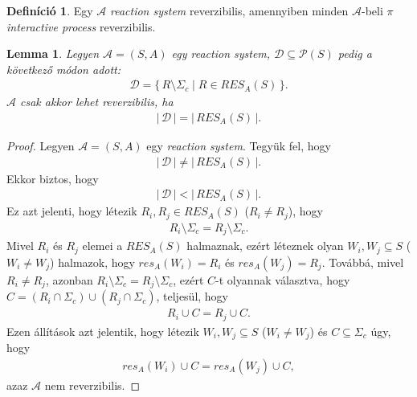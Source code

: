 \documentclass[12pt]{article}
\theoremstyle{definition}
\newtheorem*{definition*}{Definíció}
\theoremstyle{remark}
\theoremstyle{plain}
\theoremstyle{plain}
\newtheorem*{lemma*}{Lemma}
\newcommand{\res}{\textit{res}}
\begin{document}
    \begin{definition*}
        Egy $\mathscr{A}$ \textit{reaction system} reverzibilis, amennyiben minden $\mathscr{A}$-beli $\pi$ \textit{interactive process} reverzibilis.
    \end{definition*}

    \begin{lemma*}
        Legyen $\mathscr{A} = (S, A)$ egy \textit{reaction system}, $\mathcal{D} \subseteq \mathcal{P}(S)$ pedig a következő módon adott:
        \begin{align*}
            \mathcal{D} = \{ \, R \setminus \Sigma_{c} \mid R \in \textit{RES}_{A}(S) \, \}.
        \end{align*}
        $\mathscr{A}$ csak akkor lehet reverzibilis, ha
        \begin{align*}
            |\,\mathcal{D}\,| = |\,\textit{RES}_{A}(S)\,|.
        \end{align*}
    \end{lemma*}

    \begin{proof}
        Legyen $\mathscr{A} = (S, A)$ egy \textit{reaction system}. Tegyük fel, hogy 
        \begin{align*}
            |\,\mathcal{D}\,| \neq |\,\textit{RES}_{A}(S)\,|.
        \end{align*}
        Ekkor biztos, hogy
        \begin{align*}
            |\,\mathcal{D}\,| < |\,\textit{RES}_{A}(S)\,|.
        \end{align*}
        Ez azt jelenti, hogy létezik $R_{i}, R_{j} \in \textit{RES}_{A}(S)$ ($R_{i} \neq R_{j}$), hogy
        \begin{align*}
            R_{i} \setminus \Sigma_{c} = R_{j} \setminus \Sigma_{c}.
        \end{align*}
        Mivel $R_{i}$ és $R_{j}$ elemei a $\textit{RES}_{A}(S)$ halmaznak, ezért léteznek olyan $W_{i}, W_{j} \subseteq S$ ($W_{i} \neq W_{j}$) halmazok, hogy $\res_{A}(W_{i}) = R_{i}$ és $\res_{A}(W_{j}) = R_{j}$. Továbbá, mivel $R_{i} \neq R_{j}$, azonban $R_{i} \setminus \Sigma_{c} = R_{j} \setminus \Sigma_{c}$, ezért $C$-t olyannak választva, hogy $C = (R_{i} \cap \Sigma_{c}) \cup (R_{j} \cap \Sigma_{c})$, teljesül, hogy
        \begin{align*}
            R_{i} \cup C = R_{j} \cup C.
        \end{align*}
        Ezen állítások azt jelentik, hogy létezik $W_{i}, W_{j} \subseteq S$ ($W_{i} \neq W_{j}$) és $C \subseteq \Sigma_{c}$ úgy, hogy
        \begin{align*}
            \res_{A}(W_{i}) \cup C = \res_{A}(W_{j}) \cup C,
        \end{align*}
        azaz $\mathscr{A}$ nem reverzibilis.
    \end{proof}     
\end{document}
